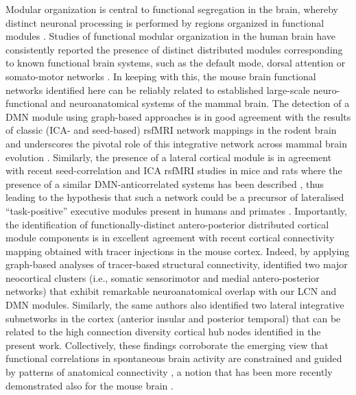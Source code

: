 Modular organization is central to functional segregation in the brain, whereby
distinct neuronal processing is performed by regions organized in functional
modules \parencite{sporns2013}. Studies of functional modular organization in the human
brain have consistently reported the presence of distinct distributed modules
corresponding to known functional brain systems, such as the default mode,
dorsal attention or somato-motor networks \parencite{meunier2009, power2011,
yeo2011}. In
keeping with this, the mouse brain functional networks identified here can be
reliably related to established large-scale neuro-functional and neuroanatomical
systems of the mammal brain. The detection of a DMN module using graph-based
approaches is in good agreement with the results of classic (ICA- and
seed-based) rsfMRI network mappings in the rodent brain \parencite{schwarz2013a,
schwarz2013, sforazzini2016, stafford2014} and underscores the pivotal role of
this integrative network across mammal brain evolution \parencite{lu2012}. Similarly, the
presence of a lateral cortical module is in agreement with recent
seed-correlation and ICA rsfMRI studies in mice and rats where the presence of a
similar DMN-anticorrelated systems has been described \parencite{schwarz2013a,
schwarz2013, sforazzini2016}, thus leading to the hypothesis that such a network
could be a precursor of lateralised “task-positive” executive modules present in
humans and primates \parencite{fox2005}. Importantly, the identification of
functionally-distinct antero-posterior distributed cortical module components is
in excellent agreement with recent cortical connectivity mapping obtained with
tracer injections in the mouse cortex. Indeed, by applying graph-based analyses
of tracer-based structural connectivity, \textcite{zingg2014} identified two
major neocortical clusters (i.e., somatic sensorimotor and medial
antero-posterior networks) that exhibit remarkable  neuroanatomical overlap
with our LCN and DMN modules. Similarly, the same authors also identified two
lateral integrative subnetworks in the cortex (anterior insular and posterior
temporal) that can be related to the high connection diversity cortical hub
nodes identified in the present work. Collectively, these findings corroborate
the emerging view that functional correlations in spontaneous brain activity
are constrained and guided by patterns of anatomical connectivity
\parencite{honey2009, sui2014}, a notion that has been more recently
demonstrated also for the mouse brain \parencite{stafford2014}. 

